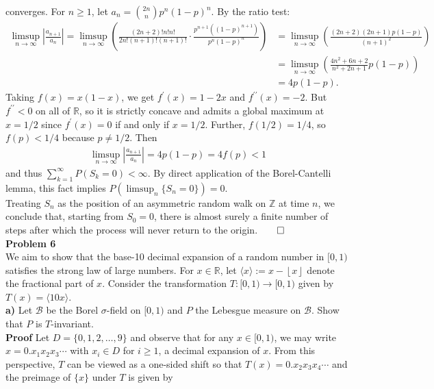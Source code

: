 \documentclass[10pt]{article}
\newcommand{\bp}[1]{\left({#1}\right)}
\newcommand{\mbb}[1]{\mathbb{#1}}
\newcommand{\1}[1]{\mathbbm{1}_{#1}}
\newcommand{\mc}[1]{\mathcal{#1}}
\newcommand{\nck}[2]{{#1\choose#2}}
\newcommand*{\floor}[1]{\left\lfloor#1\right\rfloor}
\begin{document}
    converges. For $n\geq 1$, let $a_n=\nck{2n}{n}p^n(1-p)^n$. By the ratio test:
    \begin{align*}
        \limsup_{n\rightarrow\infty}\left|\frac{a_{n+1}}{a_n}\right|=\limsup_{n\rightarrow\infty}\bp{\frac{(2n+2)!n!n!}{2n!(n+1)!(n+1)!}\cdot\frac{p^{n+1}((1-p)^{n+1})}{p^n(1-p)^{n}}}&=\limsup_{n\rightarrow\infty}\bp{\frac{(2n+2)(2n+1)p(1-p)}{(n+1)^2}}\\
        &=\limsup_{n\rightarrow\infty}\bp{\frac{4n^2+6n+2}{n^2+2n+1}p(1-p)}\\
        &=4p(1-p).
    \end{align*}
    Taking $f(x)=x(1-x)$, we get $f^\prime(x)=1-2x$ and $f^{\prime\prime}(x)=-2$. But $f^{\prime\prime}<0$ on all of $\mbb{R}$, so it is strictly concave and admits a global maximum at $x=1/2$ since $f^\prime(x)=0$ if and only if $x=1/2$. Further, $f(1/2)=1/4$, so $f(p)<1/4$ because $p\neq 1/2$. Then
    \begin{align*}
        \limsup_{n\rightarrow\infty}\left|\frac{a_{n+1}}{a_n}\right|=4p(1-p)=4f(p)<1
    \end{align*}
    and thus $\sum_{k=1}^\infty P(S_k=0)<\infty$. By direct application of the Borel-Cantelli lemma, this fact implies $P(\limsup_n\{S_n=0\})=0$. \\[5pt]
    Treating $S_n$ as the position of an asymmetric random walk on $\mbb{Z}$ at time $n$, we conclude that, starting from $S_0=0$, there is almost surely
    a finite number of steps after which the process will never return to the origin.\hfill{$\qed$}\\[5pt]
    {\bf Problem 6}\\[5pt]
    We aim to show that the base-10 decimal expansion of a random number in $[0,1)$ satisfies the strong law of large numbers. For $x\in\mbb{R}$, let $\langle x\rangle:=x-\floor{x}$ denote the fractional part of $x$. Consider the transformation $T:[0,1)\rightarrow[0,1)$ given by $T(x)=\langle 10x\rangle$.\\[5pt]
    {\bf a)}\hspace{5pt} Let $\mc{B}$ be the Borel $\sigma$-field on $[0,1)$ and $P$ the Lebesgue measure on $\mc{B}$. Show that $P$ is $T$-invariant.\\[5pt]
    {\bf Proof}\hspace{5pt} Let $D=\{0,1,2,\dots,9\}$ and observe that for any $x\in[0,1)$, we may write $x=0.x_1x_2x_3\cdots$ with $x_i\in D$ for $i\geq 1$, a decimal expansion of $x$. From this perspective, $T$ can be viewed as a one-sided shift so that $T(x)=0.x_2x_3x_4\cdots$ and the preimage of $\{x\}$ under $T$ is given by
\end{document}

